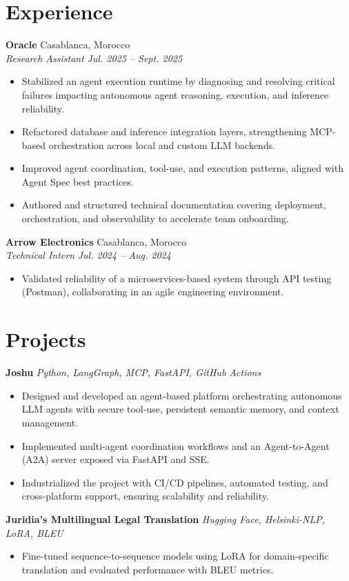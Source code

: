 \documentclass[11pt,a4paper]{article}
\newcommand{\resumeItem}[1]{\item\small{#1}}
\newcommand{\resumeSubheading}[4]{
  \vspace{1pt}
  \noindent\textbf{#1} \hfill #2 \\
  \textit{#3} \hfill \textit{#4}
  \vspace{0pt}
}
\newcommand{\resumeProjectHeading}[2]{
  \vspace{1pt}
  \noindent\textbf{#1} \hfill \textit{#2}
  \vspace{0pt}
}
\begin{document}
\section{Experience}

\resumeSubheading
{Oracle}{Casablanca, Morocco}
{Research Assistant}{Jul. 2025 -- Sept. 2025}
\begin{itemize}
    \resumeItem{Stabilized an agent execution runtime by diagnosing and resolving critical failures impacting autonomous agent reasoning, execution, and inference reliability.}
    \resumeItem{Refactored database and inference integration layers, strengthening MCP-based orchestration across local and custom LLM backends.}
    \resumeItem{Improved agent coordination, tool-use, and execution patterns, aligned with Agent Spec best practices.}
    \resumeItem{Authored and structured technical documentation covering deployment, orchestration, and observability to accelerate team onboarding.}
\end{itemize}

\resumeSubheading
{Arrow Electronics}{Casablanca, Morocco}
{Technical Intern}{Jul. 2024 -- Aug. 2024}
\begin{itemize}
    \resumeItem{Validated reliability of a microservices-based system through API testing (Postman), collaborating in an agile engineering environment.}
\end{itemize}

\section{Projects}

\resumeProjectHeading
{Joshu}{Python, LangGraph, MCP, FastAPI, GitHub Actions}
\begin{itemize}
    \resumeItem{Designed and developed an agent-based platform orchestrating autonomous LLM agents with secure tool-use, persistent semantic memory, and context management.}
    \resumeItem{Implemented multi-agent coordination workflows and an Agent-to-Agent (A2A) server exposed via FastAPI and SSE.}
    \resumeItem{Industrialized the project with CI/CD pipelines, automated testing, and cross-platform support, ensuring scalability and reliability.}
\end{itemize}

\resumeProjectHeading
{Juridia's Multilingual Legal Translation}{Hugging Face, Helsinki-NLP, LoRA, BLEU}
\begin{itemize}
    \resumeItem{Fine-tuned sequence-to-sequence models using LoRA for domain-specific translation and evaluated performance with BLEU metrics.}
\end{itemize}
\end{document}
